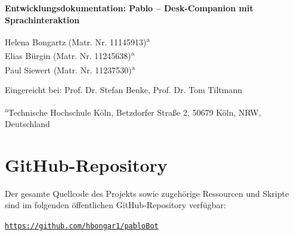 \documentclass[10pt,a4paper,twocolumn]{article}
\begin{document}
\onecolumn

\vspace*{3cm}
\begin{center}
    {\Huge\bfseries Entwicklungsdokumentation: Pablo -- Desk-Companion mit Sprachinteraktion\par}
    
    \vspace{2cm}
    
    {\LARGE
    Helena Bongartz (Matr. Nr. 11145913)\textsuperscript{a}\\
    Elias Bürgin (Matr. Nr. 11245638)\textsuperscript{a}\\
    Paul Siewert (Matr. Nr. 11237530)\textsuperscript{a}
    \par}
    
    \vspace{1.5cm}
    
    {\LARGE Eingereicht bei: Prof. Dr. Stefan Benke, Prof. Dr. Tom Tiltmann\par}
    
    \vspace{1.5cm}
    
    {\Large \textsuperscript{a}Technische Hochschule Köln, Betzdorfer Straße 2, 50679 Köln, NRW, Deutschland\par}
\end{center}

\newpage

\tableofcontents
\newpage

\twocolumn











\printbibliography

\newpage
\appendix
\section{GitHub-Repository}
Der gesamte Quellcode des Projekts sowie zugehörige Ressourcen und Skripte sind im folgenden öffentlichen GitHub-Repository verfügbar:
\begin{center}
    \href{https://github.com/hbongar1/pabloBot}{\texttt{https://github.com/hbongar1/pabloBot}}
\end{center}
\end{document}
